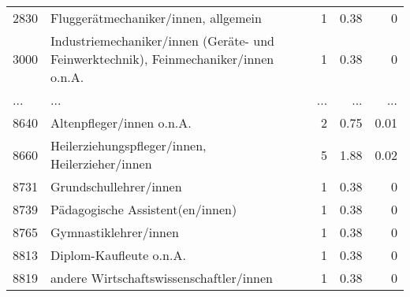 \begin{longtable}{lXrrr}
        2830 & \multicolumn{1}{X}{Fluggerätmechaniker/innen, allgemein} & %
          \num{1} &
          \num[round-mode=places,round-precision=2]{0,38} &
          \num[round-mode=places,round-precision=2]{0} \\
        3000 & \multicolumn{1}{X}{Industriemechaniker/innen (Geräte- und Feinwerktechnik), Feinmechaniker/innen o.n.A.} & %
          \num{1} &
          \num[round-mode=places,round-precision=2]{0,38} &
          \num[round-mode=places,round-precision=2]{0} \\
       ... & ... & ... & ... & ... \\
        8640 & \multicolumn{1}{X}{Altenpfleger/innen o.n.A.} & %
          \num{2} &
          \num[round-mode=places,round-precision=2]{0,75} &
          \num[round-mode=places,round-precision=2]{0,01} \\

        8660 & \multicolumn{1}{X}{Heilerziehungspfleger/innen, Heilerzieher/innen} & %
          \num{5} &
          \num[round-mode=places,round-precision=2]{1,88} &
          \num[round-mode=places,round-precision=2]{0,02} \\

        8731 & \multicolumn{1}{X}{Grundschullehrer/innen} & %
          \num{1} &
          \num[round-mode=places,round-precision=2]{0,38} &
          \num[round-mode=places,round-precision=2]{0} \\

        8739 & \multicolumn{1}{X}{Pädagogische Assistent(en/innen)} & %
          \num{1} &
          \num[round-mode=places,round-precision=2]{0,38} &
          \num[round-mode=places,round-precision=2]{0} \\

        8765 & \multicolumn{1}{X}{Gymnastiklehrer/innen} & %
          \num{1} &
          \num[round-mode=places,round-precision=2]{0,38} &
          \num[round-mode=places,round-precision=2]{0} \\

        8813 & \multicolumn{1}{X}{Diplom-Kaufleute o.n.A.} & %
          \num{1} &
          \num[round-mode=places,round-precision=2]{0,38} &
          \num[round-mode=places,round-precision=2]{0} \\

        8819 & \multicolumn{1}{X}{andere Wirtschaftswissenschaftler/innen} & %
          \num{1} &
          \num[round-mode=places,round-precision=2]{0,38} &
          \num[round-mode=places,round-precision=2]{0} \\


\end{longtable}
